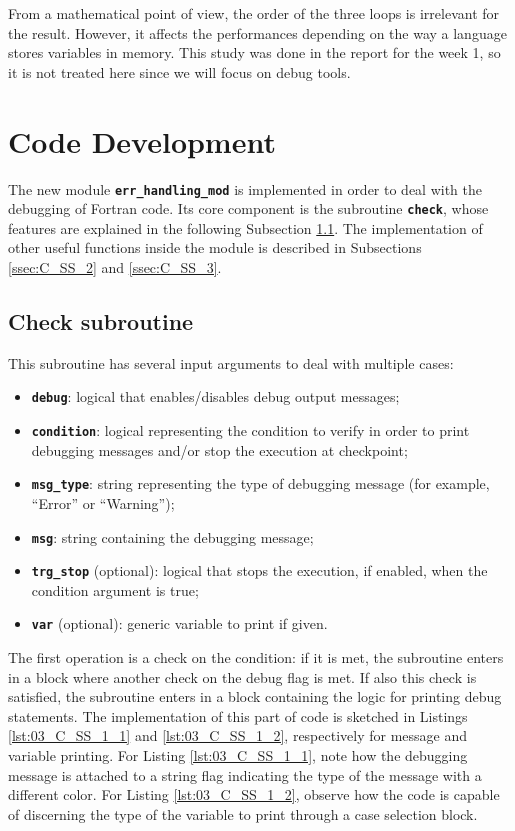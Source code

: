 \documentclass[pra, onecolumn, notitlepage, floats, 11pt]{revtex4-1}
\newcommand{\codebold}[2][cobalt]{\texttt{\bfseries {\color{#1}#2}}}
\begin{document}
From a mathematical point of view, the order of the three loops is irrelevant for the result. However, it affects the performances depending on the way a language stores variables in memory. This study was done in the report for the week 1, so it is not treated here since we will focus on debug tools.





\section{Code Development}
The new module \codebold{err\_handling\_mod} is implemented in order to deal with the debugging of Fortran code. Its core component is the subroutine \codebold{check}, whose features are explained in the following Subsection \ref{ssec:C_SS_1}. The implementation of other useful functions inside the module is described in Subsections \ref{ssec:C_SS_2} and \ref{ssec:C_SS_3}.




\subsection{Check subroutine}
\label{ssec:C_SS_1}
This subroutine has several input arguments to deal with multiple cases:
\begin{itemize}
    \item \codebold[black]{debug}: logical that enables/disables debug output messages;
    \item \codebold[black]{condition}: logical representing the condition to verify in order to print debugging messages and/or stop the execution at checkpoint;
    \item \codebold[black]{msg\_type}: string representing the type of debugging message (for example, ``Error'' or ``Warning'');
    \item \codebold[black]{msg}: string containing the debugging message;
    \item \codebold[black]{trg\_stop} (optional): logical that stops the execution, if enabled, when the condition argument is true;
    \item \codebold[black]{var} (optional): generic variable to print if given.
\end{itemize}

The first operation is a check on the condition: if it is met, the subroutine enters in a block where another check on the debug flag is met. If also this check is satisfied, the subroutine enters in a block containing the logic for printing debug statements. The implementation of this part of code is sketched in Listings \ref{lst:03_C_SS_1_1} and \ref{lst:03_C_SS_1_2}, respectively for message and variable printing. For Listing \ref{lst:03_C_SS_1_1}, note how the debugging message is attached to a string flag indicating the type of the message with a different color. For Listing \ref{lst:03_C_SS_1_2}, observe how the code is capable of discerning the type of the variable to print through a case selection block.
\end{document}
